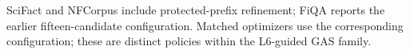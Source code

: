 SciFact and NFCorpus include protected-prefix refinement; FiQA reports the earlier fifteen-candidate configuration. Matched optimizers use the corresponding configuration; these are distinct policies within the L6-guided GAS family.
